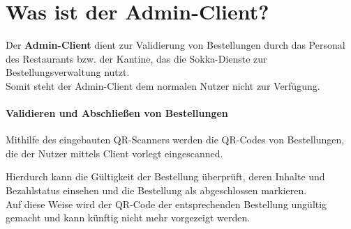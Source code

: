 \section{Was ist der Admin-Client?}

Der \textbf{Admin-Client} dient zur Validierung von Bestellungen durch das Personal des Restaurants
bzw. der Kantine, das die Sokka-Dienste zur Bestellungsverwaltung nutzt.\\
Somit steht der Admin-Client dem normalen Nutzer nicht zur Verfügung.

\paragraph{Validieren und Abschließen von Bestellungen}

Mithilfe des eingebauten QR-Scanners werden die QR-Codes von Bestellungen, die der Nutzer
mittels Client vorlegt eingescanned.

Hierdurch kann die Gültigkeit der Bestellung überprüft, deren Inhalte und Bezahlstatus einsehen
und die Bestellung als abgeschlossen markieren.\\
Auf diese Weise wird der QR-Code der entsprechenden Bestellung ungültig gemacht und kann künftig
nicht mehr vorgezeigt werden.


